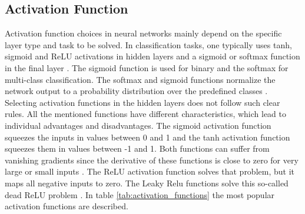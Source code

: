 \subsection{Activation Function}
Activation function choices in neural networks mainly depend on the specific layer type and task to be solved. In classification tasks, one typically uses tanh, sigmoid and ReLU activations in hidden layers and a sigmoid or softmax function in the final layer \cite{ShilohPerl2020}. The sigmoid function is used for binary and the softmax for multi-class classification. The softmax and sigmoid functions normalize the network output to a probability distribution over the predefined classes \cite{ShilohPerl2020}. Selecting activation functions in the hidden layers does not follow such clear rules. All the mentioned functions have different characteristics, which lead to individual advantages and disadvantages. The sigmoid activation function squeezes the inputs in values between 0 and 1 and the tanh activation function squeezes them in values between -1 and 1. Both functions can suffer from vanishing gradients since the derivative of these functions is close to zero for very large or small inputs \cite{Calin2020}. The ReLU activation function solves that problem, but it maps all negative inputs to zero. The Leaky Relu functions solve this so-called dead ReLU problem  \cite{Dubey2019}. In table \ref{tab:activation_functions} the most popular activation functions are described.

